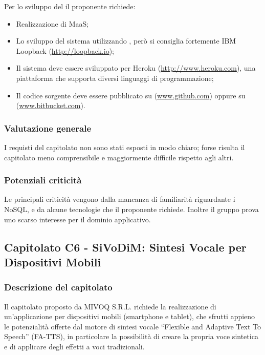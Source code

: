 \documentclass[a4paper, titlepage]{article}
\begin{document}
Per lo sviluppo del  il proponente richiede:
\begin{itemize}
	\item Realizzazione di MaaS;
	
	\item Lo sviluppo del sistema utilizzando , però si consiglia fortemente IBM Loopback (\href{http://loopback.io}{http://loopback.io});
	
	\item Il sistema deve essere sviluppato per Heroku (\href{http://www.heroku.com}{http://www.heroku.com}), una piattaforma  che supporta diversi linguaggi di programmazione;
	
	\item Il codice sorgente deve essere pubblicato su (\href{www.github.com}{www.github.com}) oppure su  (\href{www.bitbucket.com}{www.bitbucket.com}).
	
\end{itemize}


\subsubsection{Valutazione generale}
I requisti del capitolato non sono stati esposti in modo chiaro; forse risulta il capitolato meno comprensibile e maggiormente difficile rispetto agli altri.

\subsubsection{Potenziali criticità}
Le principali criticità vengono dalla mancanza di familiarità riguardante i  NoSQL, e da alcune tecnologie che il proponente richiede. Inoltre il gruppo prova uno scarso interesse per il dominio applicativo.

\newpage

\subsection{Capitolato C6 - SiVoDiM: Sintesi Vocale per Dispositivi Mobili}

\subsubsection{Descrizione del capitolato}

Il capitolato proposto da MIVOQ S.R.L. richiede la realizzazione di un'applicazione per dispositivi mobili (smartphone e tablet), che sfrutti appieno le potenzialità offerte dal motore di sintesi vocale  “Flexible and Adaptive Text To Speech” (FA-TTS), in particolare la possibilità di creare la propria voce sintetica e di applicare degli effetti a voci tradizionali.
\end{document}
